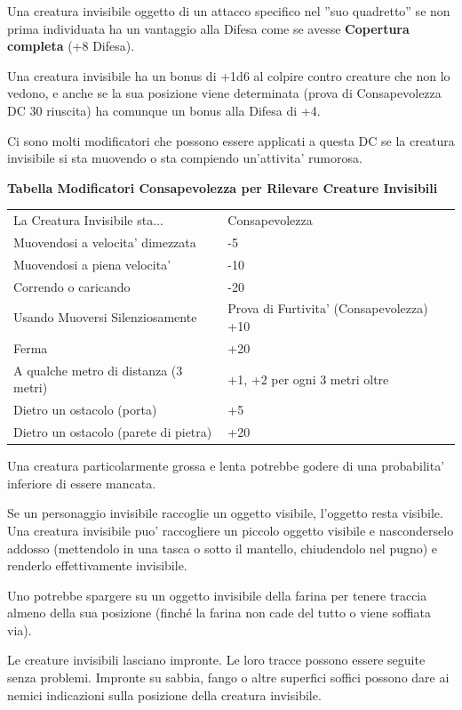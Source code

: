 \documentclass[a4paper,11pt,twoside,openany]{book}
\begin{document}
Una creatura invisibile oggetto di un attacco specifico nel ''suo quadretto'' se non prima individuata ha un vantaggio alla Difesa come se avesse \textbf{Copertura completa} (+8 Difesa).

Una creatura invisibile ha un bonus di +1d6 al colpire contro creature che non lo vedono, e anche se la sua posizione viene determinata (prova di Consapevolezza DC 30 riuscita) ha comunque un bonus alla Difesa di +4.

Ci sono molti modificatori che possono essere applicati a questa DC se la creatura invisibile si sta muovendo o sta compiendo un'attivita' rumorosa.

\bigskip

\textbf{Tabella Modificatori Consapevolezza per Rilevare Creature Invisibili}

\medskip

\begin{tabular}{ll}
\toprule
La Creatura Invisibile sta... & Consapevolezza\tabularnewline
Muovendosi a velocita' dimezzata & -5\tabularnewline
Muovendosi a piena velocita' & -10\tabularnewline
Correndo o caricando & -20\tabularnewline
Usando Muoversi Silenziosamente & Prova di Furtivita' (Consapevolezza) +10\tabularnewline
Ferma & +20\tabularnewline
A qualche metro di distanza (3 metri) & +1, +2 per ogni 3 metri oltre\tabularnewline
Dietro un ostacolo (porta) & +5\tabularnewline
Dietro un ostacolo (parete di pietra) & +20\tabularnewline

\end{tabular}

\bigskip

Una creatura particolarmente grossa e lenta potrebbe godere di una probabilita' inferiore di essere mancata.

Se un personaggio invisibile raccoglie un oggetto visibile, l'oggetto resta visibile. Una creatura invisibile puo' raccogliere un piccolo oggetto visibile e nasconderselo addosso (mettendolo in una tasca o sotto il mantello, chiudendolo nel pugno) e renderlo effettivamente invisibile.

Uno potrebbe spargere su un oggetto invisibile della farina per tenere traccia almeno della sua posizione (finché la farina non cade del tutto o viene soffiata via).

Le creature invisibili lasciano impronte. Le loro tracce possono essere seguite senza problemi. Impronte su sabbia, fango o altre superfici soffici possono dare ai nemici indicazioni sulla posizione della creatura invisibile.
\end{document}
